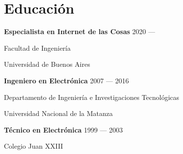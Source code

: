 \section{Educación}
\parbox[t][][t]{\linewidth}{
	\parbox{\linewidth}{\textbf{Especialista en Internet de las Cosas} \hfill {{2020 --- \phantom{2021}}}}
	\parbox{\linewidth}{{Facultad de Ingeniería}}
	\parbox{\linewidth}{{Universidad de Buenos Aires}}
	\smallskip
	\smallskip
}

\parbox[t][][t]{\linewidth}{
	\parbox{\linewidth}{\textbf{Ingeniero en Electrónica} \hfill {{2007 --- 2016}}}
	\parbox{\linewidth}{{Departamento de Ingeniería e Investigaciones Tecnológicas}}
	\parbox{\linewidth}{{Universidad Nacional de la Matanza}}
	\smallskip
	\smallskip
}

\parbox[t][][t]{\linewidth}{
	\parbox{\linewidth}{\textbf{Técnico en Electrónica} \hfill {{1999 --- 2003}}}
	\parbox{\linewidth}{{Colegio Juan XXIII}}
	\smallskip
	\smallskip
}


